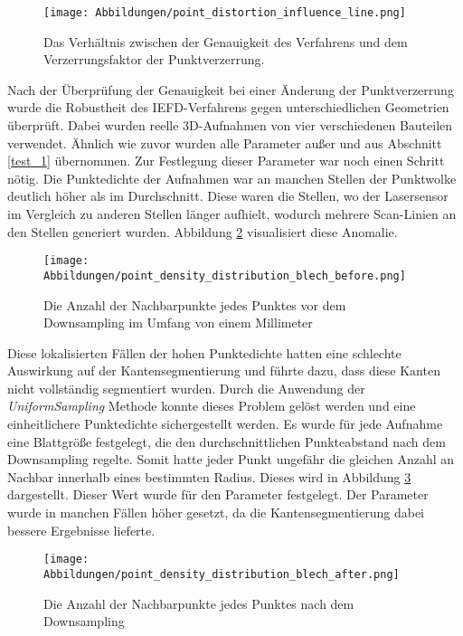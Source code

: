 \begin{figure}[h]
	\texttt{[image: Abbildungen/point\_distortion\_influence\_line.png]}
	\centering
	\caption{Das Verhältnis zwischen der Genauigkeit des Verfahrens und dem Verzerrungsfaktor der Punktverzerrung.}
	\label{fig: point_distortion_comparision}
\end{figure}

Nach der Überprüfung der Genauigkeit bei einer Änderung der Punktverzerrung wurde die Robustheit des IEFD-Verfahrens gegen unterschiedlichen Geometrien überprüft. Dabei wurden reelle 3D-Aufnahmen von vier verschiedenen Bauteilen verwendet. Ähnlich wie zuvor wurden alle Parameter außer \distthresha und \distthreshb aus Abschnitt \ref{test_1} übernommen. Zur Festlegung dieser Parameter war noch einen Schritt nötig. Die Punktedichte der Aufnahmen war an manchen Stellen der Punktwolke deutlich höher als im Durchschnitt. Diese waren die Stellen, wo der Lasersensor im Vergleich zu anderen Stellen länger aufhielt, wodurch mehrere Scan-Linien an den Stellen generiert wurden. Abbildung \ref{fig: point_density_before} visualisiert diese Anomalie. 

\begin{figure}[t]
\texttt{[image: Abbildungen/point\_density\_distribution\_blech\_before.png]}
\centering
\caption{Die Anzahl der Nachbarpunkte jedes Punktes vor dem Downsampling im Umfang von einem Millimeter}
\label{fig: point_density_before}
\end{figure}

Diese lokalisierten Fällen der hohen Punktedichte hatten eine schlechte Auswirkung auf der Kantensegmentierung und führte dazu, dass diese Kanten nicht vollständig segmentiert wurden. Durch die Anwendung der \textit{UniformSampling} Methode konnte dieses Problem gelöst werden und eine einheitlichere Punktedichte sichergestellt werden. Es wurde für jede Aufnahme eine Blattgröße festgelegt, die den durchschnittlichen Punkteabstand nach dem Downsampling regelte. Somit hatte jeder Punkt ungefähr die gleichen Anzahl an Nachbar innerhalb eines bestimmten Radius. Dieses wird in Abbildung \ref{fig: point_density_after} dargestellt. Dieser Wert wurde für den Parameter \distthresha festgelegt. Der Parameter \distthreshb wurde in manchen Fällen höher gesetzt, da die Kantensegmentierung dabei bessere Ergebnisse lieferte.

\begin{figure}[t]
	\texttt{[image: Abbildungen/point\_density\_distribution\_blech\_after.png]}
	\centering
	\caption{Die Anzahl der Nachbarpunkte jedes Punktes nach dem Downsampling}
	\label{fig: point_density_after}
\end{figure}

